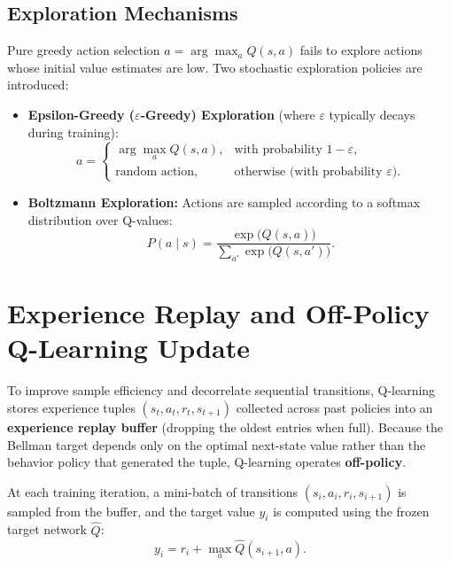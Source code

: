 \documentclass[11pt, a4paper]{article}
\begin{document}
\subsection*{Exploration Mechanisms}

Pure greedy action selection $a = \arg\max_a Q(s, a)$ fails to explore actions whose initial value estimates are low. Two stochastic exploration policies are introduced:
\begin{itemize}
    \item \textbf{Epsilon-Greedy ($\varepsilon$-Greedy) Exploration} (where $\varepsilon$ typically decays during training):
    \begin{equation}\label{eq:q-epsilon-greedy}
        a = \begin{cases}
            \arg\max_a Q(s, a), & \text{with probability } 1 - \varepsilon, \\
            \text{random action}, & \text{otherwise (with probability } \varepsilon\text{)}.
        \end{cases}
    \end{equation}

    \item \textbf{Boltzmann Exploration:} Actions are sampled according to a softmax distribution over Q-values:
    \begin{equation}\label{eq:q-boltzmann-policy}
        P(a \mid s) = \frac{\exp\big(Q(s, a)\big)}{\sum_{a'} \exp\big(Q(s, a')\big)}.
    \end{equation}
\end{itemize}

\section{Experience Replay and Off-Policy Q-Learning Update}

To improve sample efficiency and decorrelate sequential transitions, Q-learning stores experience tuples $(s_t, a_t, r_t, s_{t+1})$ collected across past policies into an \textbf{experience replay buffer} (dropping the oldest entries when full). Because the Bellman target depends only on the optimal next-state value rather than the behavior policy that generated the tuple, Q-learning operates \textbf{off-policy}.

At each training iteration, a mini-batch of transitions $(s_i, a_i, r_i, s_{i+1})$ is sampled from the buffer, and the target value $y_i$ is computed using the frozen target network $\hat{Q}$:
\begin{equation}\label{eq:q-dqn-target}
    y_i = r_i + \max_a \hat{Q}(s_{i+1}, a).
\end{equation}
\end{document}
